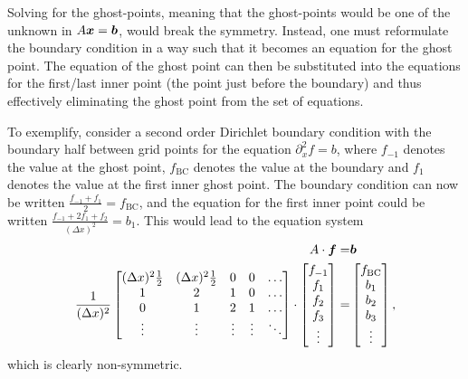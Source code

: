 Solving for the ghost-points, meaning that the ghost-points would be one of the unknown in $A\boldsymbol{x}=\boldsymbol{b}$, would break the symmetry.
Instead, one must reformulate the boundary condition in a way such that it becomes an equation for the ghost point.
The equation of the ghost point can then be substituted into the equations for the first/last inner point (the point just before the boundary) and thus effectively eliminating the ghost point from the set of equations.

To exemplify, consider a second order Dirichlet boundary condition with the boundary half between grid points for the equation $\partial_x^2 f = b$, where $f_{-1}$ denotes the value at the ghost point, $f_{\text{BC}}$ denotes the value at the boundary and $f_{1}$ denotes the value at the first inner ghost point.
The boundary condition can now be written $\frac{f_{-1}+f_{1}}{2}=f_{\text{BC}}$, and the equation for the first inner point could be written $\frac{f_{-1}+2f_1+f_{2}}{(\Delta x)^2}=b_1$.
This would lead to the equation system
%
\begin{align*}
    A\cdot\boldsymbol{f}=&\boldsymbol{b}\\
    \frac{1}{(\Delta x)^2}
    \begin{bmatrix}
        (\Delta x)^2\frac{1}{2} & (\Delta x)^2\frac{1}{2} & 0 & 0 & \ldots\\
        1                       & 2                       & 1 & 0 & \ldots\\
        0                       & 1                       & 2 & 1 & \ldots\\
        \vdots                  & \vdots              &\vdots&\vdots&\ddots\\
    \end{bmatrix}
    \cdot
    \begin{bmatrix}
        f_{-1}\\
        f_{1}\\
        f_{2}\\
        f_{3}\\
        \vdots
    \end{bmatrix}
    =&
    \begin{bmatrix}
        f_{\text{BC}}\\
        b_{1}\\
        b_{2}\\
        b_{3}\\
        \vdots
    \end{bmatrix},
\end{align*}
%
which is clearly non-symmetric.


